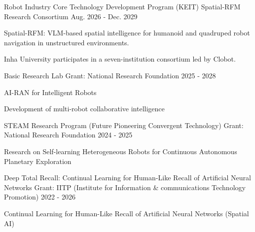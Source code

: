 

\begin{cventries}

  \cventry
    {Robot Industry Core Technology Development Program (KEIT)}
    {Spatial-RFM Research Consortium}
    {}{Aug. 2026 - Dec. 2029}
    {\begin{cvitems}
      \item {Spatial-RFM: VLM-based spatial intelligence for humanoid and quadruped robot navigation in unstructured environments.}
      \item {Inha University participates in a seven-institution consortium led by Clobot.}
    \end{cvitems}}



  \cventry
    {Basic Research Lab} %
    {Grant: National Research Foundation} %
    { } %
    {2025 - 2028} %
    {
      \begin{cvitems} %
        \item {AI-RAN for Intelligent Robots}
        \item {Development of multi-robot collaborative intelligence}
      \end{cvitems}
    }

  \cventry
    {STEAM Research Program (Future Pioneering Convergent Technology)} %
    {Grant: National Research Foundation} %
    { } %
    {2024 - 2025} %
    {
      \begin{cvitems} %
        \item {Research on Self-learning Heterogeneous Robots for Continuous Autonomous Planetary Exploration}
      \end{cvitems}
    }

    
  \cventry
    {Deep Total Recall: Continual Learning for Human-Like Recall of Artificial Neural Networks} %
    {Grant: IITP (Institute for Information \& communications Technology Promotion)} %
    { } %
    {2022 - 2026} %
    {
      \begin{cvitems} %
        \item {Continual Learning for Human-Like Recall of Artificial Neural Networks (Spatial AI)}
      \end{cvitems}
    }



\end{cventries}
